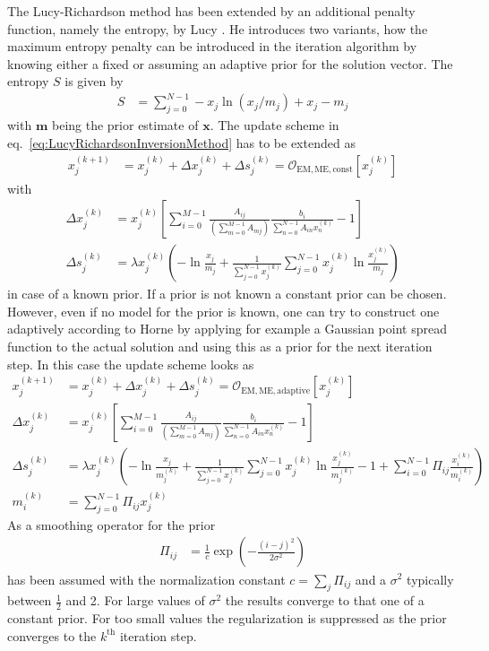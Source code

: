 The Lucy\hyp{}Richardson method \cite{Richardson1972,Lucy1974} has been extended by an additional penalty function,
namely the entropy, by Lucy \cite{Lucy1994}. He introduces two variants, how the maximum entropy penalty can be introduced in the iteration algorithm by knowing either a fixed or assuming an adaptive prior for the solution vector. The entropy $S$ is given by
\begin{align}
S&= \sum_{j=0}^{N-1} -x_j\ln\left(x_j/m_j\right) +x_j-m_j \label{eq:EMentropy}
\end{align}
with $\mathbf{m}$ being the prior estimate of $\mathbf{x}$. The update scheme in eq.\ \ref{eq:LucyRichardsonInversionMethod} has to be extended as
\begin{align}
\label{eq:LucyRichardsonInversionMethodMEconstant}
  x_j^{(k+1)} &= x_j^{(k)} + \Delta x_j^{(k)} + \Delta s_j^{(k)}= \mathcal{O}_\mathrm{EM,ME,const}\left[x_j^{(k)}\right]
\end{align}
with
\begin{align}
  \Delta x_j^{(k)} &= x_j^{(k)}\left[\sum_{i=0}^{M-1}\frac{A_{ij}}{\left(\displaystyle \sum_{m=0}^{M-1}A_{mj}\right)}\frac{b_i}{\displaystyle \sum_{n=0}^{N-1}A_{in}x_n^{(k)}}-1\right] \\
  \Delta s_j^{(k)} &=  \lambda x_j^{(k)}\left(-\ln\frac{x_j}{m_j}+\frac{1}{\sum_{j=0}^{N-1}x_j^{(k)}}\sum_{j=0}^{N-1}x_j^{(k)}\ln\frac{x_j^{(k)}}{m_j}\right)
\end{align}
in case of a known prior. If a prior is not known a constant prior can be chosen. However, even if no model for the prior is known, one can try to construct one adaptively according to Horne \cite{Horne1985} by applying for example a Gaussian point spread function to the actual solution and using this as a prior for the next iteration step. In this case the update scheme looks as
\begin{align}
\label{eq:LucyRichardsonInversionMethodMEadaptive}
  x_j^{(k+1)} &= x_j^{(k)} + \Delta x_j^{(k)} + \Delta s_j^{(k)}= \mathcal{O}_\mathrm{EM,ME,adaptive}\left[x_j^{(k)}\right]\\
  \Delta x_j^{(k)} &= x_j^{(k)}\left[\sum_{i=0}^{M-1}\frac{A_{ij}}{\left( \sum_{m=0}^{M-1}A_{mj}\right)}\frac{b_i}{ \sum_{n=0}^{N-1}A_{in}x_n^{(k)}}-1\right] \\
  \Delta s_j^{(k)} &=  \lambda x_j^{(k)}\left(-\ln\frac{x_j}{m_j^{(k)}}
                                +\frac{1}{\sum_{j=0}^{N-1}x_j^{(k)}}\sum_{j=0}^{N-1}x_j^{(k)}\ln\frac{x_j^{(k)}}{m_j^{(k)}}
                                -1+\sum_{i=0}^{N-1}\Pi_{ij}\frac{x_i^{(k)}}{m_i^{(k)}}\right) \\
  m_i^{(k)} &= \sum_{j=0}^{N-1}\Pi_{ij}x_j^{(k)}
\end{align}
As a smoothing operator for the prior
\begin{align}\label{eq:smoothingOp4prior}
  \Pi_{ij} &= \frac{1}{c}\exp\left(-\frac{(i-j)^2}{2\sigma^2}\right)
\end{align}
has been assumed with the normalization constant $c=\sum_j \Pi_{ij}$ and a $\sigma^2$ typically between $\frac12$ and 2. For large values of $\sigma^2$ the results converge to that one of a constant prior. For too small values the regularization is suppressed as the prior converges to the $k^\mathrm{th}$ iteration step.

